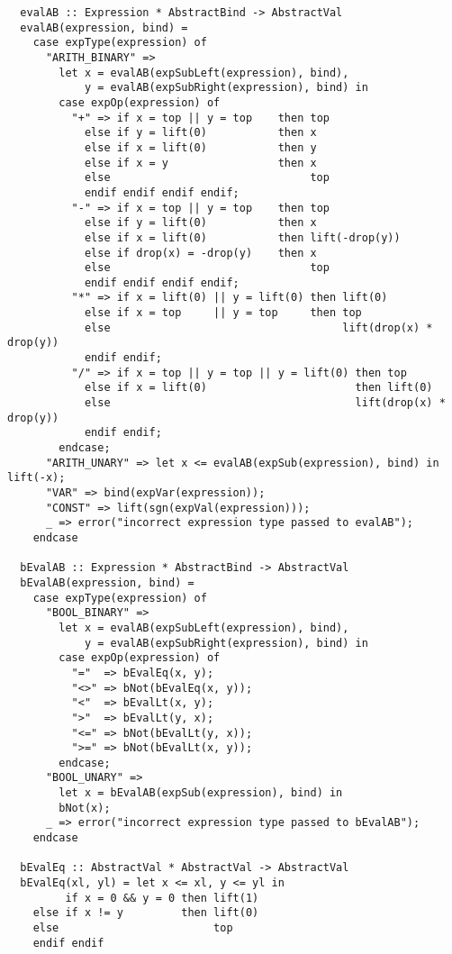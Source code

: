 \documentclass[a4paper]{article}
\begin{document}
\begin{verbatim}
  evalAB :: Expression * AbstractBind -> AbstractVal
  evalAB(expression, bind) =
    case expType(expression) of
      "ARITH_BINARY" =>
        let x = evalAB(expSubLeft(expression), bind),
            y = evalAB(expSubRight(expression), bind) in
        case expOp(expression) of
          "+" => if x = top || y = top    then top
            else if y = lift(0)           then x
            else if x = lift(0)           then y
            else if x = y                 then x
            else                               top
            endif endif endif endif;
          "-" => if x = top || y = top    then top
            else if y = lift(0)           then x
            else if x = lift(0)           then lift(-drop(y))
            else if drop(x) = -drop(y)    then x
            else                               top
            endif endif endif endif;
          "*" => if x = lift(0) || y = lift(0) then lift(0)
            else if x = top     || y = top     then top
            else                                    lift(drop(x) * drop(y))
            endif endif;
          "/" => if x = top || y = top || y = lift(0) then top
            else if x = lift(0)                       then lift(0)
            else                                      lift(drop(x) * drop(y))
            endif endif;
        endcase;
      "ARITH_UNARY" => let x <= evalAB(expSub(expression), bind) in lift(-x);
      "VAR" => bind(expVar(expression));
      "CONST" => lift(sgn(expVal(expression)));
      _ => error("incorrect expression type passed to evalAB");
    endcase

  bEvalAB :: Expression * AbstractBind -> AbstractVal
  bEvalAB(expression, bind) =
    case expType(expression) of
      "BOOL_BINARY" =>
        let x = evalAB(expSubLeft(expression), bind),
            y = evalAB(expSubRight(expression), bind) in
        case expOp(expression) of
          "="  => bEvalEq(x, y);
          "<>" => bNot(bEvalEq(x, y));
          "<"  => bEvalLt(x, y);
          ">"  => bEvalLt(y, x);
          "<=" => bNot(bEvalLt(y, x));
          ">=" => bNot(bEvalLt(x, y));
        endcase;
      "BOOL_UNARY" =>
        let x = bEvalAB(expSub(expression), bind) in
        bNot(x);
      _ => error("incorrect expression type passed to bEvalAB");
    endcase

  bEvalEq :: AbstractVal * AbstractVal -> AbstractVal
  bEvalEq(xl, yl) = let x <= xl, y <= yl in
         if x = 0 && y = 0 then lift(1)
    else if x != y         then lift(0)
    else                        top
    endif endif


\end{verbatim}
\end{document}
